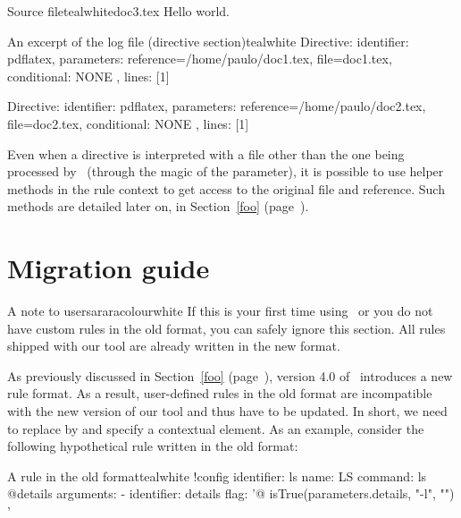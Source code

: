 \begin{ncodebox}{Source file}{teal}{\icnote}{white}{doc3.tex}
Hello world.
\bye
\end{ncodebox}

\begin{codebox}{An excerpt of the log file (directive section)}{teal}{\icnote}{white}
Directive: { identifier: pdflatex, parameters:
{reference=/home/paulo/doc1.tex, file=doc1.tex},
conditional: { NONE }, lines: [1] }

Directive: { identifier: pdflatex, parameters:
{reference=/home/paulo/doc2.tex, file=doc2.tex},
conditional: { NONE }, lines: [1] }
\end{codebox}

Even when a directive is interpreted with a file other than the one being processed by \arara\ (through the magic of the  parameter), it is possible to use helper methods in the rule context to get access to the original file and reference. Such methods are detailed later on, in Section~\ref{foo} (page~\pageref{foo}).

\section{Migration guide}
\label{sec:migrationguide}

\begin{messagebox}{A note to users}{araracolour}{\icattention}{white}
If this is your first time using \arara\ or you do not have custom rules in the old format, you can safely ignore this section. All rules shipped with our tool are already written in the new format.
\end{messagebox}

As previously discussed in Section~\ref{foo} (page~\pageref{foo}), version 4.0 of \arara\ introduces a new rule format. As a result, user-defined rules in the old format are incompatible with the new version of our tool and thus have to be updated. In short, we need to replace  by  and specify a contextual element. As an example, consider the following hypothetical rule  written in the old format:

\begin{codebox}{A rule in the old format}{teal}{\icnote}{white}
!config
identifier: ls
name: LS
command: ls @{details}
arguments:
- identifier: details
  flag: '@{ isTrue(parameters.details, "-l", "") }'
\end{codebox}

